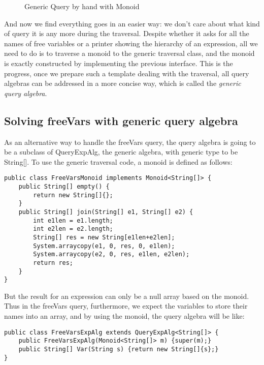 \begin{figure}[!htbp]
\vspace{-.1in}
\caption{Generic Query by hand with Monoid}
\end{figure}

And now we find everything goes in an easier way: we don't care about what kind of query it is any more during the traversal. Despite whether it asks for all the names of free variables or a printer showing the hierarchy of an expression, all we need to do is to traverse a monoid to the generic traversal class, and the monoid is exactly constructed by implementing the previous interface. This is the progress, once we prepare such a template dealing with the traversal, all query algebras can be addressed in a more concise way, which is called the \textit{generic query algebra}.

\subsection{Solving freeVars with generic query algebra}\label{subsec:solvingfreevars}

As an alternative way to handle the freeVars query, the query algebra is going to be a subclass of QueryExpAlg, the generic algebra, with generic type to be String[]. To use the generic traversal code, a monoid is defined as follows:

\begin{lstlisting}[numbers=none]
public class FreeVarsMonoid implements Monoid<String[]> {
    public String[] empty() {
        return new String[]{};
    }
    public String[] join(String[] e1, String[] e2) {
        int e1len = e1.length;
        int e2len = e2.length;
        String[] res = new String[e1len+e2len];
        System.arraycopy(e1, 0, res, 0, e1len);
        System.arraycopy(e2, 0, res, e1len, e2len);
        return res;
    }
}
\end{lstlisting}

But the result for an expression can only be a null array based on the monoid. Thus in the freeVars query, furthermore, we expect the variables to store their names into an array, and by using the monoid, the query algebra will be like:

\begin{lstlisting}[numbers=none]
public class FreeVarsExpAlg extends QueryExpAlg<String[]> {
    public FreeVarsExpAlg(Monoid<String[]> m) {super(m);}
    public String[] Var(String s) {return new String[]{s};}
}
\end{lstlisting}

